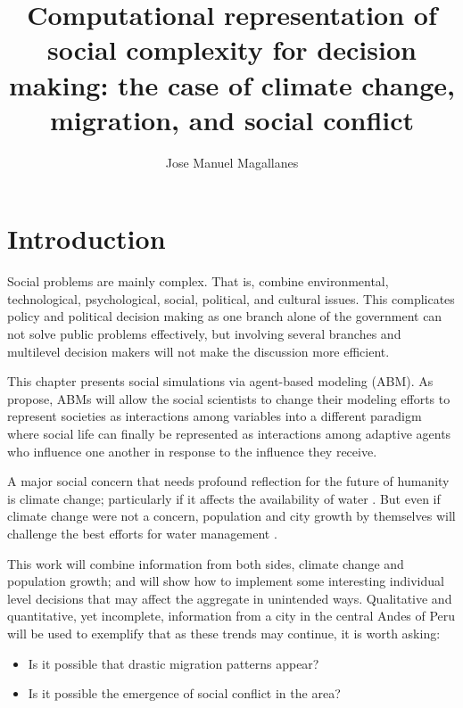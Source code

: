 \documentclass[doc,12pt,floatsintext]{apa7}
\title{Computational representation of social complexity for decision making: the case of climate change, migration, and social conflict}
\author{Jose Manuel Magallanes}
\begin{document}

\maketitle %

\section{Introduction} 

Social problems are mainly complex. That is, combine environmental, technological, psychological, social, political, and cultural issues. This complicates policy  and political decision making as one branch alone of the government can not solve public problems effectively, but involving several branches and multilevel decision makers will not make the discussion more efficient. 

This chapter presents social simulations via agent-based modeling (ABM). As \textcite{macy_factors_2002} propose, ABMs will allow the social scientists to change their  modeling efforts to represent societies as interactions among variables into a different paradigm where social life can finally be represented as interactions among adaptive agents who influence one another in response to the influence they receive.

A major social concern that needs profound reflection for the future of humanity is climate change; particularly if it affects the availability of water \parencite{robinson_water_2023}. But even if climate change were not a concern,  population and city growth by themselves will challenge the best efforts for water management \parencite{unesco_nature-based_2018}. 

This work will combine information from both sides, climate change and population growth; and will show how to implement some interesting individual level decisions that may affect the aggregate in  unintended ways. Qualitative and quantitative, yet incomplete,  information from a city in the central Andes of Peru will be used to exemplify that as these trends may continue, it is worth asking:
\begin{itemize}
\item Is it possible that drastic migration patterns appear?
\item Is it possible the emergence of social conflict in the area?
\end{itemize}
\end{document}
